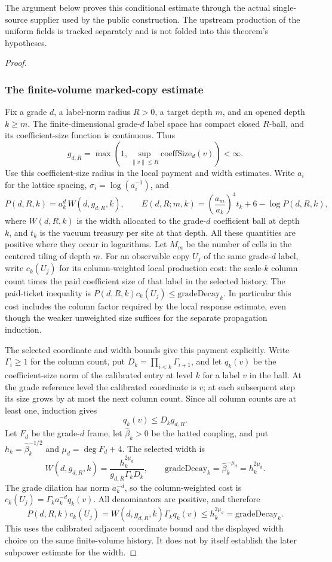The argument below proves this conditional estimate through the actual single-source supplier used by the public construction. The upstream production of the uniform fields is tracked separately and is not folded into this theorem's hypotheses.

\begin{proof}

\subsubsection{The finite-volume marked-copy estimate}

Fix a grade $d$, a label-norm radius $R>0$, a target depth $m$, and an opened depth $k\geq m$. The finite-dimensional grade-$d$ label space has compact closed $R$-ball, and its coefficient-size function is continuous. Thus
\[
 g_{d,R}=\max\!\left(1,\sup_{\|v\|\leq R}\mathrm{coeffSize}_d(v)\right)<\infty.
\]
Use this coefficient-size radius in the local payment and width estimates. Write $a_i$ for the lattice spacing, $\sigma_i=\log(a_i^{-1})$, and
\[
  P(d,R,k)=a_k^d\,W(d,g_{d,R},k),\qquad
  E(d,R;m,k)=\left(\frac{a_m}{a_k}\right)^4 t_k+6-\log P(d,R,k),
\]
where $W(d,R,k)$ is the width allocated to the grade-$d$ coefficient ball at depth $k$, and $t_k$ is the vacuum treasury per site at that depth. All these quantities are positive where they occur in logarithms. Let $M_m$ be the number of cells in the centered tiling of depth $m$. For an observable copy $U_j$ of the same grade-$d$ label, write $c_k(U_j)$ for its column-weighted local production cost: the scale-$k$ column count times the paid coefficient size of that label in the selected history. The paid-ticket inequality is $P(d,R,k)c_k(U_j)\leq\mathrm{gradeDecay}_k$. In particular this cost includes the column factor required by the local response estimate, even though the weaker unweighted size suffices for the separate propagation induction.

The selected coordinate and width bounds give this payment explicitly.
Write $\Gamma_i\geq1$ for the column count, put
$D_k=\prod_{i<k}\Gamma_{i+1}$, and let $q_k(v)$ be the coefficient-size
norm of the calibrated entry at level $k$ for a label $v$ in the ball.
At the grade reference level the calibrated coordinate is $v$; at each
subsequent step its size grows by at most the next column count. Since all
column counts are at least one, induction gives
\[
 q_k(v)\leq D_k g_{d,R}.
\]
Let $F_d$ be the grade-$d$ frame, let $\widehat\beta_k>0$ be the hatted coupling, and put $h_k=\widehat\beta_k^{-1/2}$ and $\mu_d=\deg F_d+4$. The selected width
is
\[
 W(d,g_{d,R},k)=\frac{h_k^{2\mu_d}}{g_{d,R}\Gamma_kD_k},
 \qquad \mathrm{gradeDecay}_k=\widehat\beta_k^{-\mu_d}=h_k^{2\mu_d}.
\]
The grade dilation has norm $a_k^{-d}$, so the column-weighted cost is
$c_k(U_j)=\Gamma_k a_k^{-d}q_k(v)$. All denominators are positive, and
therefore
\[
 P(d,R,k)c_k(U_j)
 =W(d,g_{d,R},k)\Gamma_k q_k(v)
 \leq h_k^{2\mu_d}=\mathrm{gradeDecay}_k.
\]
This uses the calibrated adjacent coordinate bound and the displayed width
choice on the same finite-volume history. It does not by itself establish
the later subpower estimate for the width.


\end{proof}
